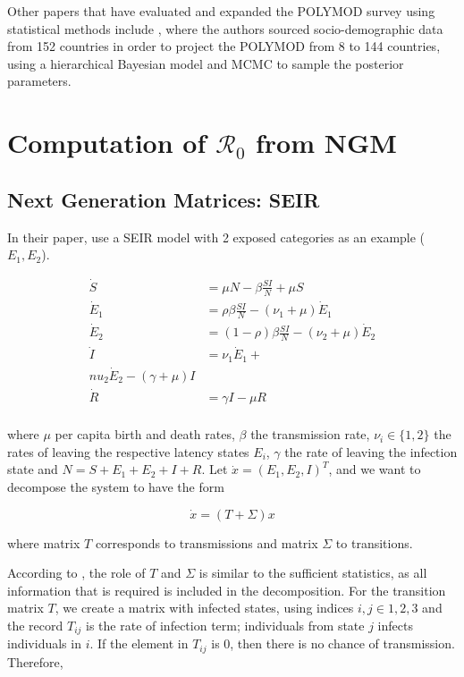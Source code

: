 \documentclass[12pt]{article}
\begin{document}
Other papers that have evaluated and expanded the POLYMOD survey using statistical methods include \cite{Kiesha:2017}, where the authors sourced socio-demographic data from 152 countries in order to project the POLYMOD from 8 to 144 countries, using a hierarchical Bayesian model and MCMC to sample the posterior parameters.

\section{Computation of $\mathcal{R}_{0}$ from NGM}
\label{sec:2}

\subsection{Next Generation Matrices: SEIR}
\label{sub:2.1}

In their paper, \cite[p.875]{Diekmann:2010} use a SEIR model with 2 exposed categories as an example ($E_{1}, E_{2}$).

\begin{align*}
\dot{S} & =  \mu N - \beta\frac{SI}{N} + \mu S \\
\dot{E}_{1}  & =  \rho \beta \frac{SI}{N} - (\nu_{1} + \mu)\dot{E}_{1} \\
\dot{E}_{2}  & =  (1 - \rho) \beta \frac{SI}{N} - (\nu_{2} + \mu)\dot{E}_{2}\\
\dot{I}  & =  \nu_{1} \dot{E}_{1}  + \\nu_{2} \dot{E}_{2}  - (\gamma + \mu) I \\
\dot{R}  & =  \gamma I - \mu R\\
\end{align*}

where $\mu$ per capita birth and death rates, $\beta$ the transmission rate, $\nu_{i}\in\{1, 2\}$ the rates of leaving the respective latency states $E_{i}$, $\gamma$ the rate of leaving the infection state and $N=S + E_{1} + E_{2} + I + R$.
Let $\dot{x} = (E_{1}, E_{2}, I)^{T}$, and we want to decompose the system to have the form

\begin{equation}
\dot{x} = (T + \Sigma)x
\end{equation} 

where matrix $T$ corresponds to transmissions and matrix $\Sigma$ to transitions. 

According to \cite{Diekmann:2010}, the role of $T$ and $\Sigma$ is similar to the sufficient statistics, as all information that is required is included in the decomposition. For the transition matrix $T$, we create a matrix with infected states, using indices $i, j\in {1, 2, 3}$ and the record $T_{ij}$ is the rate of infection term; individuals from state $j$ infects individuals in $i$. If the element in $T_{ij}$ is 0, then there is no chance of transmission.  Therefore, 
\end{document}
